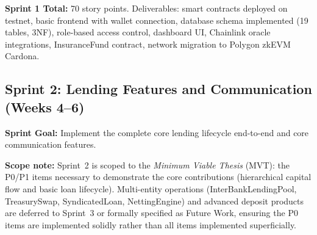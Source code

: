 \documentclass[12pt,a4paper]{report}
\begin{document}
\textbf{Sprint 1 Total:} 70 story points. Deliverables: smart contracts deployed on testnet, basic frontend with wallet connection, database schema implemented (19 tables, 3NF), role-based access control, dashboard UI, Chainlink oracle integrations, InsuranceFund contract, network migration to Polygon zkEVM Cardona.


\subsection{Sprint 2: Lending Features and Communication (Weeks 4--6)}

\textbf{Sprint Goal:} Implement the complete core lending lifecycle end-to-end and core communication features.

\textbf{Scope note:} Sprint~2 is scoped to the \textit{Minimum Viable Thesis} (MVT): the P0/P1 items necessary to demonstrate the core contributions (hierarchical capital flow and basic loan lifecycle). Multi-entity operations (InterBankLendingPool, TreasurySwap, SyndicatedLoan, NettingEngine) and advanced deposit products are deferred to Sprint~3 or formally specified as Future Work, ensuring the P0 items are implemented solidly rather than all items implemented superficially.
\end{document}
